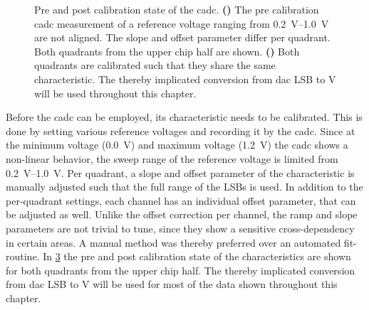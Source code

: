 \begin{figure}[htb!]
	\begin{subfigure}{0.65\textwidth}
		\caption{}
		\vspace{-0.4cm}
		
		\label{precadccalib}
		\vspace{0.4cm}
	\end{subfigure}
	\begin{subfigure}{0.35\textwidth}
		\caption{}
		
		\label{postcadccalib}
	\end{subfigure}
	\caption[Pre and post calibration state of the \gls{cadc}.]{Pre and post calibration state of the \gls{cadc}. \textbf{()} The pre calibration \gls{cadc} measurement of a reference voltage ranging from \SIrange{0.2}{1.0}{\V} are not aligned. The slope and offset parameter differ per quadrant. Both quadrants from the upper chip half are shown. \textbf{()} Both quadrants are calibrated such that they share the same characteristic. The thereby implicated conversion from \gls{dac} LSB to \si{\V} will be used throughout this chapter.}
	\label{cadccalibration}
\end{figure}
Before the \gls{cadc} can be employed, its characteristic needs to be calibrated. This is done by setting various reference voltages and recording it by the \gls{cadc}. Since at the minimum voltage (\SI{0.0}{\V}) and maximum voltage (\SI{1.2}{\V}) the \gls{cadc} shows a non-linear behavior, the sweep range of the reference voltage is limited from \SIrange{0.2}{1.0}{\V}. Per quadrant, a slope and offset parameter of the characteristic is manually adjusted such that the full range of the LSBs is used. In addition to the per-quadrant settings, each channel has an individual offset parameter, that can be adjusted as well. Unlike the offset correction per channel, the ramp and slope parameters are not trivial to tune, since they show a sensitive cross-dependency in certain areas. A manual method was thereby preferred over an automated fit-routine. In \cref{cadccalibration} the pre and post calibration state of the characteristics are shown for both quadrants from the upper chip half. The thereby implicated conversion from \gls{dac} LSB to \si{\V} will be used for most of the data shown throughout this chapter.

